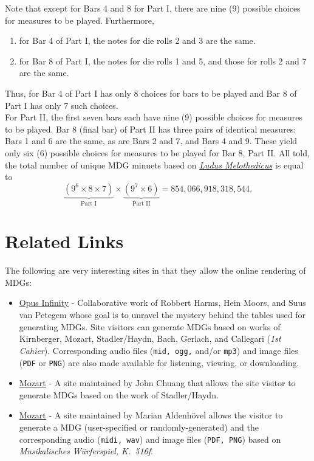 \documentclass[a4paper,x11names,svgnames,10pt]{article}
\begin{document}
{Note that except for Bars 4 and 8 for Part I, there are nine (9) possible choices for measures to be played.  Furthermore, 
\begin{enumerate}
	\item for Bar 4 of Part I, the notes for die rolls 2 and 3 are the same.
	\item for Bar 8 of Part I, the notes for die rolls 1 and 5, and those for rolls 2 and 7 are the same.
\end{enumerate}
Thus, for Bar 4 of Part I has only 8 choices for bars to be played and Bar 8 of Part I has only 7 such choices. \\

For Part II, the first seven bars each have nine (9) possible choices for measures to be played.  Bar 8 (final bar) of Part II has three pairs of identical measures: Bars 1 and 6 are the same, as are Bars 2 and 7, and Bars 4 and 9.  These yield only six (6) possible choices for measures to be played for Bar 8, Part II. All told, the total number of unique MDG minuets based on \href{https://imslp.org/wiki/Ludus_Melothedicus_(Anonymous)}{\it Ludus Melothedicus} is equal to $$\underbrace{(9^6\times 8\times 7)}_{\text{Part I}} \times \underbrace{(9^7\times 6)}_{\text{Part II}} = 854\!,066\!,918\!,318\!,544.$$

\section{Related Links}
The following are very interesting sites in that they allow the online rendering of MDGs:
\begin{itemize}
	\item \href{https://opus-infinity.org}{Opus Infinity} - Collaborative work of Robbert Harms, Hein Moors, and Suus van Petegem whose goal is to unravel the mystery behind the tables used for generating MDGs.  Site visitors can generate MDGs based on works of Kirnberger, Mozart, Stadler/Haydn, Bach, Gerlach, and Callegari ({\it 1st Cahier}).  Corresponding audio files ({\tt mid, ogg,} and/or {\tt mp3}) and image files ({\tt PDF} or {\tt PNG}) are also made available for listening, viewing, or downloading.
	
	\item  \href{http://sunsite.univie.ac.at/Mozart/dice/}{Mozart} - A site maintained by John Chuang that allows the site visitor to generate MDGs based on the work of Stadler/Haydn.
	
	\item  \href{https://marian-aldenhoevel.de/mozart/}{Mozart} - A site maintained by Marian Aldenh\"{o}vel allows the visitor to generate a MDG (user-specified or randomly-generated) and the corresponding audio ({\tt midi, wav}) and image files ({\tt PDF, PNG}) based on {\em Musikalisches W\"{u}rferspiel, K.\ 516f}.
	

\end{itemize}}
\end{document}
